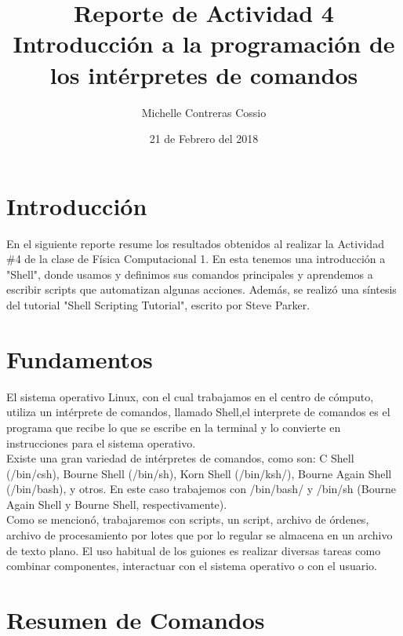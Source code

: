 \documentclass[a4paper]{article}
\title{Reporte de Actividad 4\\Introducción a la programación de los intérpretes de comandos}
\author{Michelle Contreras Cossio}
\date{21 de Febrero del 2018}
\begin{document}
\maketitle

\section{Introducción} 
En el siguiente reporte resume los resultados obtenidos al realizar la Actividad \#4 de la clase de Física Computacional 1. En esta tenemos una introducción a "Shell", donde usamos y definimos sus comandos principales y aprendemos a escribir scripts que automatizan algunas acciones. Además, se realizó una síntesis del tutorial "Shell Scripting Tutorial", escrito por Steve Parker. 

\section{Fundamentos}

El sistema operativo Linux, con el cual trabajamos en el centro de cómputo, utiliza un intérprete de comandos, llamado Shell,el interprete de comandos es el programa que recibe lo que se escribe en la terminal y lo convierte en instrucciones para el sistema operativo. \\
 
Existe una gran variedad de intérpretes de comandos, como son:  C Shell (/bin/csh), Bourne Shell (/bin/sh), Korn Shell (/bin/ksh/), Bourne Again Shell (/bin/bash), y otros. En este caso trabajemos con /bin/bash/ y /bin/sh (Bourne Again Shell y Bourne Shell, respectivamente). \\

Como se mencionó, trabajaremos con scripts, un script, archivo de órdenes, archivo de procesamiento por lotes que por lo regular se almacena en un archivo de texto plano. El uso habitual de los guiones es realizar diversas tareas como combinar componentes, interactuar con el sistema operativo o con el usuario. 

\section{Resumen de Comandos}
\end{document}

